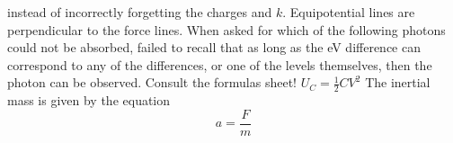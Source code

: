 instead of incorrectly forgetting the charges and $k$.\markdownRendererInterblockSeparator
{}\markdownRendererUlBeginTight
\markdownRendererUlItem Equipotential lines are perpendicular to the force lines.\markdownRendererUlItemEnd 
\markdownRendererUlItem When asked for which of the following photons could not be absorbed, failed to recall that as long as the eV difference can correspond to any of the differences, or one of the levels themselves, then the photon can be observed.\markdownRendererUlItemEnd 
\markdownRendererUlItem Consult the formulas sheet! $U_C = \frac{1}{2}CV^2$\markdownRendererUlItemEnd 
\markdownRendererUlItem The inertial mass is given by the equation $$a = \frac{F}{m}$$\markdownRendererUlItemEnd 
\markdownRendererUlEndTight \relax